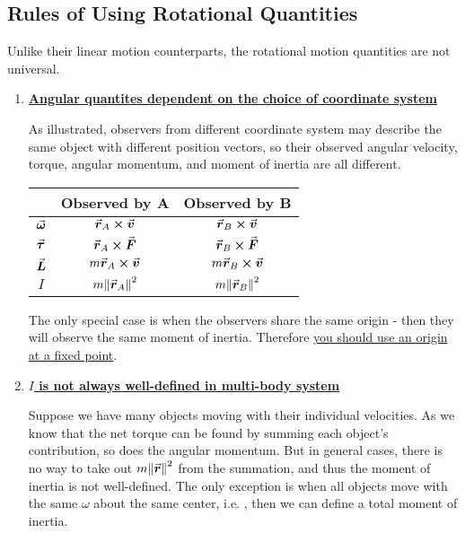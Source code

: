 \documentclass[class=article, crop=false, 12pt]{standalone}
\begin{document}
\subsection{Rules of Using Rotational Quantities}

Unlike their linear motion counterparts, 
the rotational motion quantities are not universal.

\begin{enumerate}
    \item \bf{\ul{Angular quantites dependent on the choice of coordinate system}}


    As illustrated, observers from different coordinate system may describe 
    the same object with different position vectors,
    so their observed angular velocity, torque, angular momentum, and moment of inertia are all different. 
    \begin{table}[h!]
    \centering
        \begin{tabular}{ccc}
        & Observed by A & Observed by B \\ 
        \hline \hline
        $\va*{\omega}$ & $\va*{r}_A\cross\va*{v}$ & $\va*{r}_B\cross\va*{v}$ \\ 
        \hline
        $\va*{\tau}$ & $\va*{r}_A\cross\va*{F}$ & $\va*{r}_B\cross\va*{F}$ \\ 
        \hline
        $\va*{L}$ & $m\va*{r}_A\cross\va*{v}$ & $m\va*{r}_B\cross\va*{v}$ \\ 
        \hline
        $I$ & $m \norm{\va*{r}_A}^2$ & $m\norm{\va*{r}_B}^2$ 
        \end{tabular}
    \end{table}

    The only special case is when the observers share the same origin - 
    then they will observe the same moment of inertia. 
    Therefore \ul{you should use an origin at a fixed point}.

    \item \bf{\ul{$I$ is not always well-defined in multi-body system}}
    

    Suppose we have many objects moving with their individual velocities.
    As we know that the net torque can be found by summing each object's contribution,
    so does the angular momentum. 
    But in general cases, there is no way to take out $m\norm{\va*{r}}^2$ from the summation, 
    and thus the moment of inertia is not well-defined. 
    The only exception is when all objects move with the same $\omega$ about the same center,
    i.e. ,
    then we can define a total moment of inertia.
    

\end{enumerate}
\end{document}
